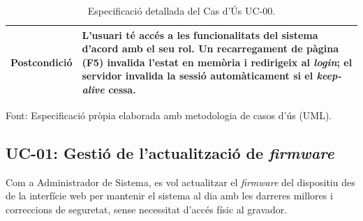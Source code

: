 \begin{table}[htbp]
\begin{tabular}{|l|p{10cm}|}
    \textbf{Postcondició}                   & L'usuari té accés a les funcionalitats del sistema d'acord amb el seu rol. Un recarregament de pàgina (F5) invalida l'estat en memòria i redirigeix al \textit{login}; el servidor invalida la sessió automàticament si el \textit{keep-alive} cessa.  \\ \hline
  \end{tabular}
  \caption{Especificació detallada del Cas d'Ús UC-00.}
  \label{tab:uc_login}
\par\smallskip
\small Font: Especificació pròpia elaborada amb metodologia de casos d'ús (UML).
\end{table}

\clearpage
\subsection{UC-01: Gestió de l'actualització de \textit{firmware}}
Com a Administrador de Sistema, es vol actualitzar el \textit{firmware} del dispositiu des de la interfície web per mantenir el sistema al dia amb les darreres millores i correccions de seguretat, sense necessitat d'accés físic al gravador.

